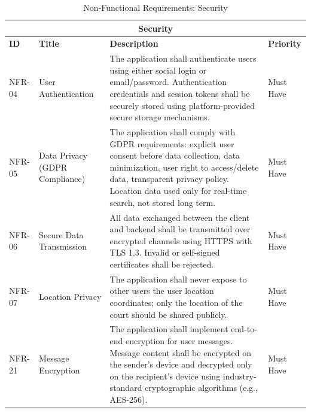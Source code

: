 \vspace{1cm}

\begin{table}[h]
	\centering
	\caption{Non-Functional Requirements: Security}
	\label{tab:nfr-security}
	\begin{tabular}{p{2cm}p{4cm}p{7cm}p{2cm}}
		\toprule
		\multicolumn{4}{c}{\textbf{Security}}\\
		\midrule
		\textbf{ID} & \textbf{Title} & \textbf{Description} & \textbf{Priority} \\
		\midrule
		NFR-04 & User Authentication & The application shall authenticate users using either social login or email/password. Authentication credentials and session tokens shall be securely stored using platform-provided secure storage mechanisms. & Must Have \\
		\midrule
		NFR-05 & Data Privacy (GDPR Compliance) & The application shall comply with GDPR requirements: explicit user consent before data collection, data minimization, user right to access/delete data, transparent privacy policy. Location data used only for real-time search, not stored long term. & Must Have \\
		\midrule
		NFR-06 & Secure Data Transmission & All data exchanged between the client and backend shall be transmitted over encrypted channels using HTTPS with TLS 1.3. Invalid or self-signed certificates shall be rejected. & Must Have \\
		\midrule
		NFR-07 & Location Privacy & The application shall never expose to other users the user location coordinates; only the location of the court should be shared publicly. & Must Have \\
		\midrule
		NFR-21 & Message Encryption & The application shall implement end-to-end encryption for user messages. Message content shall be encrypted on the sender's device and decrypted only on the recipient's device using industry-standard cryptographic algorithms (e.g., AES-256). & Must Have \\
		\bottomrule
	\end{tabular}
\end{table}

\vspace{1cm}

